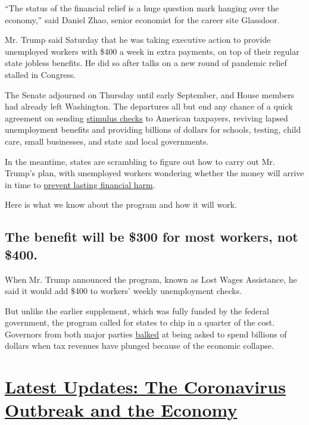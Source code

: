 ``The status of the financial relief is a huge question mark hanging
over the economy,'' said Daniel Zhao, senior economist for the career
site Glassdoor.

Mr. Trump said Saturday that he was taking executive action to provide
unemployed workers with \$400 a week in extra payments, on top of their
regular state jobless benefits. He did so after talks on a new round of
pandemic relief stalled in Congress.

The Senate adjourned on Thursday until early September, and House
members had already left Washington. The departures all but end any
chance of a quick agreement on sending
\href{https://www.nytimes3xbfgragh.onion/article/stimulus-unemployment-payment-benefi.html}{stimulus
checks} to American taxpayers, reviving lapsed unemployment benefits and
providing billions of dollars for schools, testing, child care, small
businesses, and state and local governments.

In the meantime, states are scrambling to figure out how to carry out
Mr. Trump's plan, with unemployed workers wondering whether the money
will arrive in time to
\href{https://www.nytimes3xbfgragh.onion/2020/08/08/business/economy/lost-unemployment-benefits.html}{prevent
lasting financial harm}.

Here is what we know about the program and how it will work.

\hypertarget{the-benefit-will-be-300-for-most-workers-not-400}{%
\subsection{The benefit will be \$300 for most workers, not
\$400.}\label{the-benefit-will-be-300-for-most-workers-not-400}}

When Mr. Trump announced the program, known as Lost Wages Assistance, he
said it would add \$400 to workers' weekly unemployment checks.

But unlike the earlier supplement, which was fully funded by the federal
government, the program called for states to chip in a quarter of the
cost. Governors from both major parties
\href{https://www.nytimes3xbfgragh.onion/2020/08/10/us/politics/virus-stimulus-congress-trump.html}{balked}
at being asked to spend billions of dollars when tax revenues have
plunged because of the economic collapse.

\hypertarget{latest-updates-the-coronavirus-outbreak-and-the-economy}{%
\section{\texorpdfstring{\href{https://www.nytimes3xbfgragh.onion/live/2020/09/11/business/stock-market-today-coronavirus?action=click\&pgtype=Article\&state=default\&region=MAIN_CONTENT_1\&context=storylines_live_updates}{Latest
Updates: The Coronavirus Outbreak and the
Economy}}{Latest Updates: The Coronavirus Outbreak and the Economy}}\label{latest-updates-the-coronavirus-outbreak-and-the-economy}}

